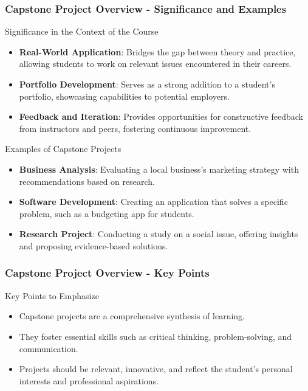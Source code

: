 \documentclass[aspectratio=169]{beamer}
\begin{document}
\begin{frame}[fragile]
    \frametitle{Capstone Project Overview - Significance and Examples}
    \begin{block}{Significance in the Context of the Course}
        \begin{itemize}
            \item \textbf{Real-World Application}: Bridges the gap between theory and practice, allowing students to work on relevant issues encountered in their careers.
            \item \textbf{Portfolio Development}: Serves as a strong addition to a student's portfolio, showcasing capabilities to potential employers.
            \item \textbf{Feedback and Iteration}: Provides opportunities for constructive feedback from instructors and peers, fostering continuous improvement.
        \end{itemize}
    \end{block}

    \begin{block}{Examples of Capstone Projects}
        \begin{itemize}
            \item \textbf{Business Analysis}: Evaluating a local business's marketing strategy with recommendations based on research.
            \item \textbf{Software Development}: Creating an application that solves a specific problem, such as a budgeting app for students.
            \item \textbf{Research Project}: Conducting a study on a social issue, offering insights and proposing evidence-based solutions.
        \end{itemize}
    \end{block}
\end{frame}

\begin{frame}[fragile]
    \frametitle{Capstone Project Overview - Key Points}
    \begin{block}{Key Points to Emphasize}
        \begin{itemize}
            \item Capstone projects are a comprehensive synthesis of learning.
            \item They foster essential skills such as critical thinking, problem-solving, and communication.
            \item Projects should be relevant, innovative, and reflect the student's personal interests and professional aspirations.
        \end{itemize}
    \end{block}
\end{frame}
\end{document}
